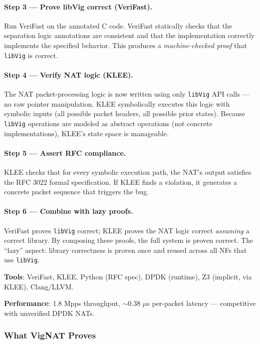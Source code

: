 \paragraph{Step 3 --- Prove libVig correct (VeriFast).}
Run VeriFast on the annotated C code. VeriFast statically checks that the separation logic annotations are consistent and that the implementation correctly implements the specified behavior. This produces a \emph{machine-checked proof} that \texttt{libVig} is correct.

\paragraph{Step 4 --- Verify NAT logic (KLEE).}
The NAT packet-processing logic is now written using only \texttt{libVig} API calls --- no raw pointer manipulation. KLEE symbolically executes this logic with symbolic inputs (all possible packet headers, all possible prior states). Because \texttt{libVig} operations are modeled as abstract operations (not concrete implementations), KLEE's state space is manageable.

\paragraph{Step 5 --- Assert RFC compliance.}
KLEE checks that for every symbolic execution path, the NAT's output satisfies the RFC 3022 formal specification. If KLEE finds a violation, it generates a concrete packet sequence that triggers the bug.

\paragraph{Step 6 --- Combine with lazy proofs.}
VeriFast proves \texttt{libVig} correct; KLEE proves the NAT logic correct \emph{assuming} a correct library. By composing these proofs, the full system is proven correct. The ``lazy'' aspect: library correctness is proven once and reused across all NFs that use \texttt{libVig}.

\textbf{Tools}: VeriFast, KLEE, Python (RFC spec), DPDK (runtime), Z3 (implicit, via KLEE), Clang/LLVM.

\textbf{Performance}: 1.8 Mpps throughput, $\sim$0.38 $\mu$s per-packet latency --- competitive with unverified DPDK NATs.

\subsubsection{What VigNAT Proves}

